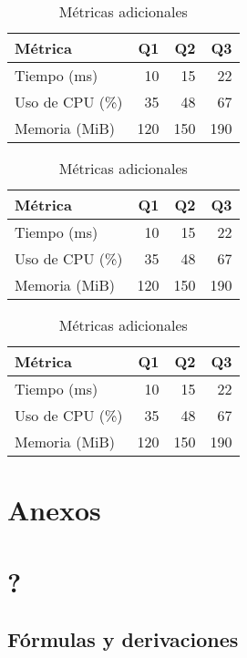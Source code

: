 \documentclass{report}
\begin{document}
\begin{table}[htbp]
  \centering
  \caption{Métricas adicionales}
  \begin{tabular}{@{}lrrr@{}}
    \toprule
    Métrica & Q1 & Q2 & Q3 \\
    \midrule
    Tiempo (ms) & 10 & 15 & 22 \\
    Uso de CPU (\%) & 35 & 48 & 67 \\
    Memoria (MiB) & 120 & 150 & 190 \\
    \bottomrule
  \end{tabular}
\end{table}
\begin{table}[htbp]
  \centering
  \caption{Métricas adicionales}
  \begin{tabular}{@{}lrrr@{}}
    \toprule
    Métrica & Q1 & Q2 & Q3 \\
    \midrule
    Tiempo (ms) & 10 & 15 & 22 \\
    Uso de CPU (\%) & 35 & 48 & 67 \\
    Memoria (MiB) & 120 & 150 & 190 \\
    \bottomrule
  \end{tabular}
\end{table}
\begin{table}[htbp]
  \centering
  \caption{Métricas adicionales}
  \begin{tabular}{@{}lrrr@{}}
    \toprule
    Métrica & Q1 & Q2 & Q3 \\
    \midrule
    Tiempo (ms) & 10 & 15 & 22 \\
    Uso de CPU (\%) & 35 & 48 & 67 \\
    Memoria (MiB) & 120 & 150 & 190 \\
    \bottomrule
  \end{tabular}
\end{table}

\part{Anexos}
\appendix
\part{?}

\chapter{Fórmulas y derivaciones}
\end{document}
